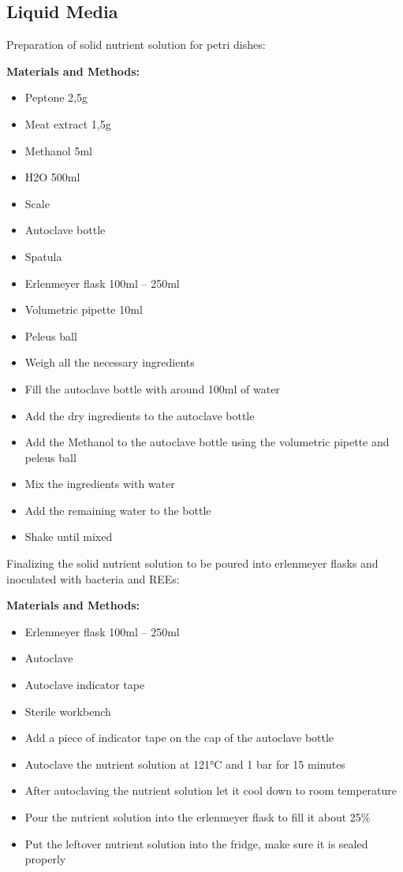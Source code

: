 \subsection{Liquid Media}

Preparation of solid nutrient solution for petri dishes:

\textbf{Materials and Methods:}

\begin{itemize}
    \item Peptone 2,5g
    \item Meat extract 1,5g
    \item Methanol 5ml
    \item H2O 500ml
    \item Scale
    \item Autoclave bottle
    \item Spatula
    \item Erlenmeyer flask 100ml – 250ml
    \item Volumetric pipette 10ml
    \item Peleus ball
    \item Weigh all the necessary ingredients
    \item Fill the autoclave bottle with around 100ml of water
    \item Add the dry ingredients to the autoclave bottle
    \item Add the Methanol to the autoclave bottle using the volumetric pipette and
    peleus ball
    \item Mix the ingredients with water
    \item Add the remaining water to the bottle
    \item Shake until mixed
\end{itemize}

Finalizing the solid nutrient solution to be poured into erlenmeyer flasks and inoculated
with bacteria and REEs:

\textbf{Materials and Methods:}

\begin{itemize}
    \item Erlenmeyer flask 100ml – 250ml
    \item Autoclave
    \item Autoclave indicator tape
    \item Sterile workbench
    \item Add a piece of indicator tape on the cap of the autoclave bottle
    \item Autoclave the nutrient solution at 121°C and 1 bar for 15 minutes
    \item After autoclaving the nutrient solution let it cool down to room temperature
    \item Pour the nutrient solution into the erlenmeyer flask to fill it about 25\%
    \item Put the leftover nutrient solution into the fridge, make sure it is sealed
    properly
\end{itemize}

